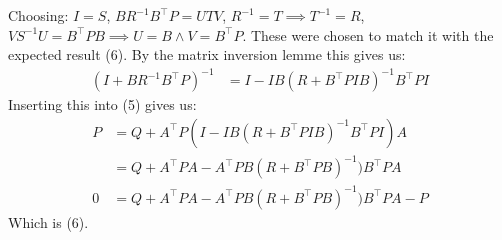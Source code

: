\documentclass[11pt, a4paper, english]{NTNUoving}
\begin{document}

\begin{oppgave}
    Choosing:
    $I = S$, $BR^{-1}B^\top P = UTV$, $R^{-1} = T \implies T^{-1} = R$,
    $VS^{-1}U = B^\top P B \implies U = B \wedge V = B^\top P$.
    These were chosen to match it with the expected result (6).
    By the matrix inversion lemme this gives us:
    \begin{align*}
        (I + BR^{-1}B^\top P)^{-1} &= I - IB(R + B^\top PIB)^{-1} B^\top PI
    \end{align*}
    Inserting this into (5) gives us:
    \begin{align*}
        P &= Q + A^\top P(I - IB(R + B^\top PIB)^{-1} B^\top PI)A \\
        &= Q + A^\top P A - A^\top P B (R + B^\top PB)^{-1})B^\top PA \\
        0 &= Q + A^\top P A - A^\top P B (R + B^\top PB)^{-1})B^\top PA - P
    \end{align*}
    Which is (6).
\end{oppgave}
\end{document}
